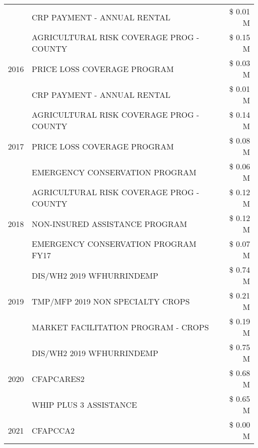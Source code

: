 \begin{tabular}{llr}
 & CRP PAYMENT - ANNUAL RENTAL & \$ 0.01 M \\
\cline{1-3}
\multirow[t]{3}{*}{2016} & AGRICULTURAL RISK COVERAGE PROG - COUNTY & \$ 0.15 M \\
 & PRICE LOSS COVERAGE PROGRAM & \$ 0.03 M \\
 & CRP PAYMENT - ANNUAL RENTAL & \$ 0.01 M \\
\cline{1-3}
\multirow[t]{3}{*}{2017} & AGRICULTURAL RISK COVERAGE PROG - COUNTY & \$ 0.14 M \\
 & PRICE LOSS COVERAGE PROGRAM & \$ 0.08 M \\
 & EMERGENCY CONSERVATION PROGRAM & \$ 0.06 M \\
\cline{1-3}
\multirow[t]{3}{*}{2018} & AGRICULTURAL RISK COVERAGE PROG - COUNTY & \$ 0.12 M \\
 & NON-INSURED ASSISTANCE PROGRAM & \$ 0.12 M \\
 & EMERGENCY CONSERVATION PROGRAM FY17 & \$ 0.07 M \\
\cline{1-3}
\multirow[t]{3}{*}{2019} & DIS/WH2 2019 WFHURRINDEMP & \$ 0.74 M \\
 & TMP/MFP 2019 NON SPECIALTY CROPS & \$ 0.21 M \\
 & MARKET FACILITATION PROGRAM - CROPS & \$ 0.19 M \\
\cline{1-3}
\multirow[t]{3}{*}{2020} & DIS/WH2 2019 WFHURRINDEMP & \$ 0.75 M \\
 & CFAPCARES2 & \$ 0.68 M \\
 & WHIP PLUS 3 ASSISTANCE & \$ 0.65 M \\
\cline{1-3}
2021 & CFAPCCA2 & \$ 0.00 M \\
\cline{1-3}
\bottomrule
\end{tabular}
